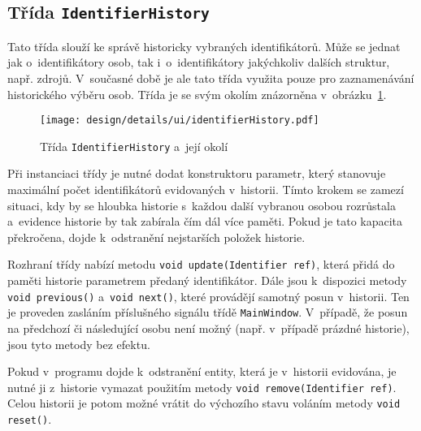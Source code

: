 		\subsection*{Třída \texttt{IdentifierHistory}}
		Tato třída slouží ke správě historicky vybraných identifikátorů. Může se jednat jak o~identifikátory osob, tak i~o~identifikátory jakýchkoliv dalších struktur, např. zdrojů. V~současné době je ale tato třída využita pouze pro zaznamenávání historického výběru osob. Třída je se svým okolím znázorněna v~obrázku~\ref{fig:designDetailIdentifierHistory}.\par
		\begin{figure}[h]
			\centering
			\texttt{[image: design/details/ui/identifierHistory.pdf]}
			\caption{Třída \texttt{IdentifierHistory} a~její okolí}
			\label{fig:designDetailIdentifierHistory}
		\end{figure}
		Při instanciaci třídy je nutné dodat konstruktoru parametr, který stanovuje maximální počet identifikátorů evidovaných v~historii. Tímto krokem se zamezí situaci, kdy by se hloubka historie s~každou další vybranou osobou rozrůstala a~evidence historie by tak zabírala čím dál více paměti. Pokud je tato kapacita překročena, dojde k~odstranění nejstarších položek historie.\par
		Rozhraní třídy nabízí metodu \texttt{void update(Identifier ref)}, která přidá do paměti historie parametrem předaný identifikátor. Dále jsou k~dispozici metody \texttt{void previous()} a~\texttt{void next()}, které provádějí samotný posun v~historii. Ten je proveden zasláním příslušného signálu třídě \texttt{MainWindow}. V~případě, že posun na předchozí či následující osobu není možný (např. v~případě prázdné historie), jsou tyto metody bez efektu.\par
		Pokud v~programu dojde k~odstranění entity, která je v~historii evidována, je nutné ji z~historie vymazat použitím metody \texttt{void remove(Identifier ref)}. Celou historii je potom možné vrátit do výchozího stavu voláním metody \texttt{void reset()}.\par
		
